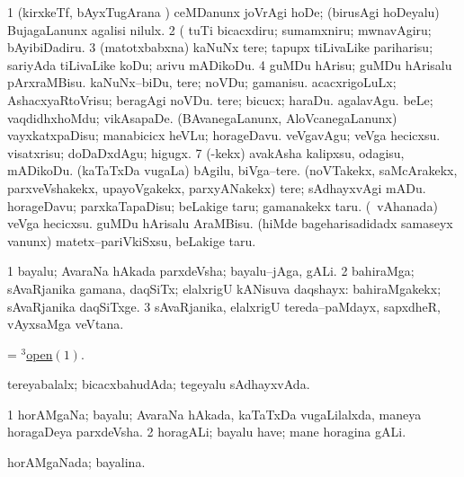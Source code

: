 \noindent
\gl{\pagu}
\bmng
\bnum
\num{1}  (kirxkeTf, bAyxTugArana \vi) ceMDanunx joVrAgi hoDe; (birusAgi hoDeyalu) BujagaLanunx agalisi nilulx. 
\num{2}  (  tuTi bicacxdiru; sumamxniru; mwnavAgiru; bAyibiDadiru. 
\num{3}  (matotxbabxna) kaNuNx tere; tapupx tiLivaLike pariharisu; sariyAda tiLivaLike koDu; arivu mADikoDu. 
\num{4}  guMDu hArisu; guMDu hArisalu pArxraMBisu. 
  
\banum
{} kaNuNx--biDu, tere; noVDu; gamanisu. 
 acacxrigoLuLx; AshacxyaRtoVrisu; beragAgi noVDu. 
\eanum
\numie
{}  
\banum
{} tere; bicucx; haraDu. 
 agalavAgu. 
 beLe; vaqdidhxhoMdu; vikAsapaDe. 
 (BAvanegaLanunx, AloVcanegaLanunx) vayxkatxpaDisu; manabicicx heVLu; horageDavu. 
 veVgavAgu; veVga hecicxsu. 
 visatxrisu; doDaDxdAgu; higugx. 
\eanum
\numie
\num{7}  (-kekx) avakAsha kalipxsu, odagisu, mADikoDu. 
  
\banum
{} (kaTaTxDa \mo vugaLa) bAgilu, biVga--tere. 
 (noVTakekx, saMcArakekx, parxveVshakekx, upayoVgakekx, parxyANakekx) tere; sAdhayxvAgi mADu. 
 horageDavu; parxkaTapaDisu; beLakige taru; gamanakekx taru. 
 (\kanmu\ vAhanada) veVga hecicxsu. 
 guMDu hArisalu AraMBisu. 
 (hiMde bageharisadidadx samaseyx \mo vanunx) matetx--pariVkiSxsu, beLakige taru. 
\eanum
\numie
\enum
\emng
\eentry

\bentry
{}
\gl{\nA}
\bmng
\bnum
\num{1} bayalu; AvaraNa hAkada parxdeVsha; bayalu--jAga, gALi. 
\num{2} bahiraMga; sAvaRjanika gamana, daqSiTx; elalxrigU kANisuva daqshayx:  bahiraMgakekx; sAvaRjanika daqSiTxge. 
\num{3} sAvaRjanika, elalxrigU tereda--paMdayx, sapxdheR, vAyxsaMga veVtana. 
\enum
\emng

\noindent
\gl{\pagu}
\bmng
{} = \hyperlink{open(3)}{$^3$open\((1)\)}. 
\emng
\eentry

\bentry
{}
\gl{\gu}
\bmng
tereyabalalx; bicacxbahudAda; tegeyalu sAdhayxvAda. 
\emng
\eentry

\bentry
{}
\gl{\nA}
\bmng
\bnum
\num{1} horAMgaNa; bayalu; AvaraNa hAkada, kaTaTxDa \mo vugaLilalxda, maneya horagaDeya parxdeVsha. 
\num{2} horagALi; bayalu have; mane horagina gALi. 
\enum
\emng
\eentry

\bentry
{}
\gl{\gu}
\bmng
horAMgaNada; bayalina. 
\emng
\eentry

